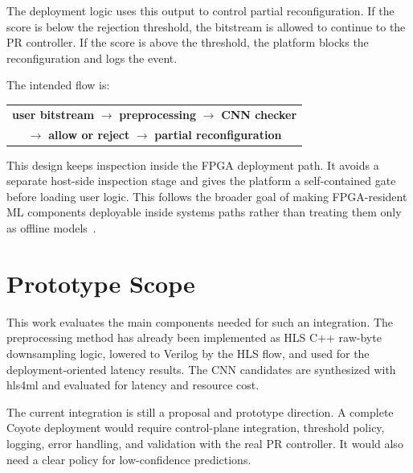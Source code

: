 The deployment logic uses this output to control partial reconfiguration. If the score is below the rejection threshold, the bitstream is allowed to continue to the PR controller. If the score is above the threshold, the platform blocks the reconfiguration and logs the event.

The intended flow is:

\begin{center}
\small
\begin{tabular}{c}
\textbf{user bitstream} $\rightarrow$ \textbf{preprocessing} $\rightarrow$ \textbf{CNN checker} \\[3pt]
$\rightarrow$ \textbf{allow or reject} $\rightarrow$ \textbf{partial reconfiguration}
\end{tabular}
\end{center}

This design keeps inspection inside the FPGA deployment path. It avoids a separate host-side inspection stage and gives the platform a self-contained gate before loading user logic. This follows the broader goal of making FPGA-resident ML components deployable inside systems paths rather than treating them only as offline models~\cite{heer2025ml4sys}.

\section{Prototype Scope}
\label{sec:coyote-prototype-scope}

This work evaluates the main components needed for such an integration. The preprocessing method has already been implemented as HLS C++ raw-byte downsampling logic, lowered to Verilog by the HLS flow, and used for the deployment-oriented latency results. The CNN candidates are synthesized with hls4ml and evaluated for latency and resource cost.

The current integration is still a proposal and prototype direction. A complete Coyote deployment would require control-plane integration, threshold policy, logging, error handling, and validation with the real PR controller. It would also need a clear policy for low-confidence predictions.
